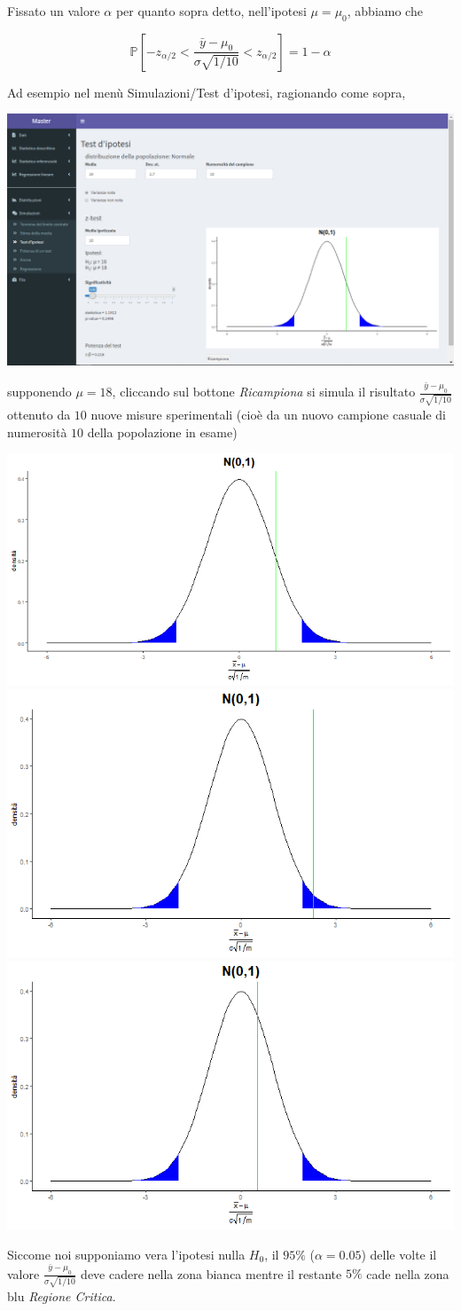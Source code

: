 \documentclass[
  11pt,
]{book}
\begin{document}
Fissato un valore \(\alpha\) per quanto sopra detto, nell'ipotesi \(\mu=\mu_0\), abbiamo che

\[
\mathbb{P}[- z_{\alpha/2}<\frac{\bar{y}-\mu_0}{\sigma\sqrt{1/10}} < z_{\alpha/2}] = 1-\alpha
\]

Ad esempio nel menù Simulazioni/Test d'ipotesi, ragionando come sopra,

\begin{center}\includegraphics[width=0.5\linewidth]{Immagini/Inferenziale/test_ip} \end{center}

supponendo \(\mu=18\), cliccando sul bottone \emph{Ricampiona} si simula il risultato \(\frac{\bar{y}-\mu_0}{\sigma\sqrt{1/10}}\) ottenuto da \(10\) nuove misure sperimentali (cioè da un nuovo campione casuale di numerosità \(10\) della popolazione in esame)

\includegraphics[width=0.35\linewidth]{Immagini/Inferenziale/test_ip1}
\includegraphics[width=0.35\linewidth]{Immagini/Inferenziale/test_ip2}
\includegraphics[width=0.35\linewidth]{Immagini/Inferenziale/test_ip3}

Siccome noi supponiamo vera l'ipotesi nulla \(H_0\), il \(95 \%\) (\(\alpha=0.05\)) delle volte il valore \(\frac{\bar{y}-\mu_0}{\sigma\sqrt{1/10}}\) deve cadere nella zona bianca mentre il restante \(5 \%\) cade nella zona blu \emph{Regione Critica}.
\end{document}
